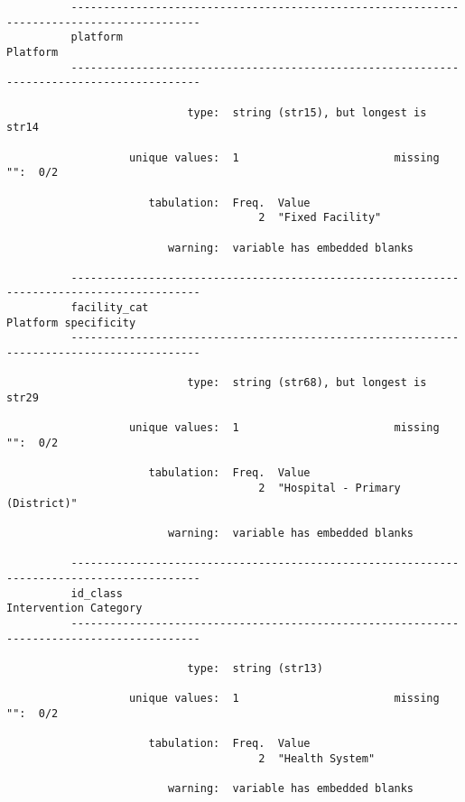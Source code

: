 \documentclass{article}
\begin{document}
\begin{verbatim}
          ------------------------------------------------------------------------------------------
          platform                                                                          Platform
          ------------------------------------------------------------------------------------------
          
                            type:  string (str15), but longest is str14
          
                   unique values:  1                        missing "":  0/2
          
                      tabulation:  Freq.  Value
                                       2  "Fixed Facility"
          
                         warning:  variable has embedded blanks
          
          ------------------------------------------------------------------------------------------
          facility_cat                                                          Platform specificity
          ------------------------------------------------------------------------------------------
          
                            type:  string (str68), but longest is str29
          
                   unique values:  1                        missing "":  0/2
          
                      tabulation:  Freq.  Value
                                       2  "Hospital - Primary (District)"
          
                         warning:  variable has embedded blanks
          
          ------------------------------------------------------------------------------------------
          id_class                                                             Intervention Category
          ------------------------------------------------------------------------------------------
          
                            type:  string (str13)
          
                   unique values:  1                        missing "":  0/2
          
                      tabulation:  Freq.  Value
                                       2  "Health System"
          
                         warning:  variable has embedded blanks
          

\end{verbatim}
\end{document}
